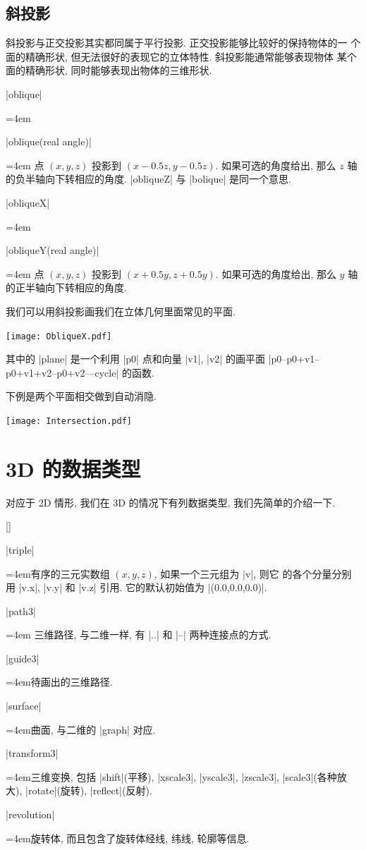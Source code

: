 \documentclass[nofonts,CJKnormalspaces]{ctexbook}[2009/05/20]
\newenvironment{funclist}{\trivlist
  \parindent=0pt
\item[]
  \def\item{\medskip\par\leftskip=0pt}
  \def\go{\par\leftskip=4em}}
{\endtrivlist}
\begin{document}
\subsection{斜投影}
斜投影与正交投影其实都同属于平行投影. 正交投影能够比较好的保持物体的一
个面的精确形状, 但无法很好的表现它的立体特性. 斜投影能通常能够表现物体
某个面的精确形状, 同时能够表现出物体的三维形状.
\begin{funclist}
\item |oblique| \go
\item |oblique(real angle)| \go
  点 $(x,y,z)$ 投影到 $(x-0.5z,y-0.5z)$. 如果可选的角度给出, 那么 $z$ 轴
  的负半轴向下转相应的角度. |obliqueZ| 与 |bolique| 是同一个意思.
\item |obliqueX| \go
\item |obliqueY(real angle)| \go
  点 $(x,y,z)$ 投影到 $(x+0.5y,z+0.5y)$. 如果可选的角度给出, 那么 $y$ 轴
  的正半轴向下转相应的角度.
\end{funclist}

我们可以用斜投影画我们在立体几何里面常见的平面.
\begin{center}\texttt{[image: ObliqueX.pdf]}\end{center}%


其中的 |plane| 是一个利用 |p0| 点和向量 |v1|, |v2| 的画平面
|p0--p0+v1--p0+v1+v2--p0+v2---cycle| 的函数.

下例是两个平面相交做到自动消隐.
\begin{center}\texttt{[image: Intersection.pdf]}\end{center}%



\section{3D 的数据类型}
对应于 2D 情形, 我们在 3D 的情况下有列数据类型, 我们先简单的介绍一下.
\begin{funclist}
\item  |triple| \go 有序的三元实数组 $(x,y,z)$, 如果一个三元组为 |v|, 则它
  的各个分量分别用 |v.x|, |v.y| 和 |v.z| 引用. 它的默认初始值为 |(0.0,0.0,0.0)|.
\item  |path3| \go
  三维路径, 与二维一样, 有 |..| 和 |--| 两种连接点的方式.
\item  |guide3| \go 待画出的三维路径.
\item |surface| \go 曲面, 与二维的 |graph| 对应.
\item |transform3| \go 三维变换, 包括 |shift|(平移), |xscale3|, |yscale3|,
  |zscale3|, |scale3|(各种放大), |rotate|(旋转), |reflect|(反射).
\item |revolution| \go 旋转体, 而且包含了旋转体经线, 纬线, 轮廓等信息.
\end{funclist}
\end{document}
